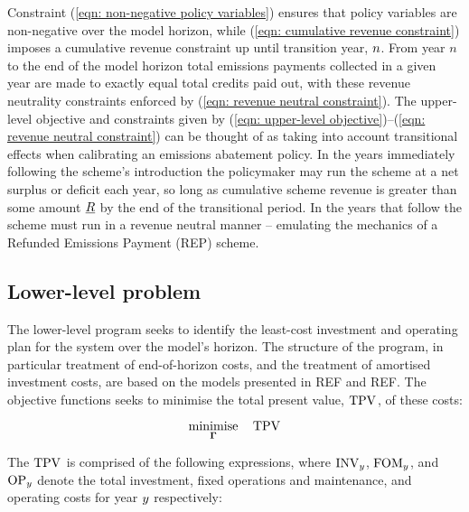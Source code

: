 \documentclass{article}
\DeclareMathOperator*{\minimise}{minimise}
\begin{document}
Constraint (\ref{eqn: non-negative policy variables}) ensures that policy variables are non-negative over the model horizon, while (\ref{eqn: cumulative revenue constraint}) imposes a cumulative revenue constraint up until transition year, $\iYearTransition$. From year $n$ to the end of the model horizon total emissions payments collected in a given year are made to exactly equal total credits paid out, with these revenue neutrality constraints enforced by (\ref{eqn: revenue neutral constraint}). The upper-level objective and constraints given by (\ref{eqn: upper-level objective})--(\ref{eqn: revenue neutral constraint}) can be thought of as taking into account transitional effects when calibrating an emissions abatement policy. In the years immediately following the scheme's introduction the policymaker may run the scheme at a net surplus or deficit each year, so long as cumulative scheme revenue is greater than some amount $\cMinimumCumulativeSchemeRevenue$ by the end of the transitional period. In the years that follow the scheme must run in a revenue neutral manner -- emulating the mechanics of a Refunded Emissions Payment (REP) scheme.

\subsection{Lower-level problem}
The lower-level program seeks to identify the least-cost investment and operating plan for the system over the model's horizon. The structure of the program, in particular treatment of end-of-horizon costs, and the treatment of amortised investment costs, are based on the models presented in REF and REF. The objective functions seeks to minimise the total present value, $\cTotalPresentValue$, of these costs:


\begin{equation}
	\minimise\limits_{\bm{\Gamma}} \quad \cTotalPresentValue
\end{equation}

The $\cTotalPresentValue$ is comprised of the following expressions, where $\cInvestmentCost$, $\cFixedOperationsMaintenanceCost$, and $\cOperatingCost[\iYear]$ denote the total investment, fixed operations and maintenance, and operating costs for year $\iYear$ respectively:
\end{document}

